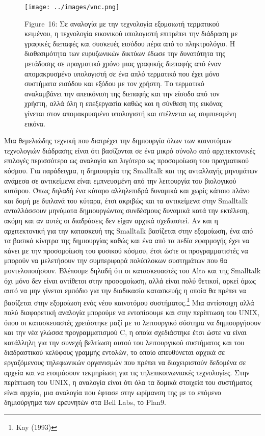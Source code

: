 \documentclass[
]{article}
\begin{document}
\leavevmode{}%
\begin{figure}
\hypertarget{fig:vnc}{%
\centering
\texttt{[image: ../images/vnc.png]}
\caption{Figure~16: Σε αναλογία με την τεχνολογία εξομοιωτή τερματικού
κειμένου, η τεχνολογία εικονικού υπολογιστή επιτρέπει την διάδραση με
γραφικές διεπαφές και συσκευές εισόδου πέρα από το πληκτρολόγιο. Η
διαθεσιμότητα των ευρυζωνικών δικτύων έδωσε την δυνατότητα της μετάδοσης
σε πραγματικό χρόνο μιας γραφικής διεπαφής από έναν απομακρυσμένο
υπολογιστή σε ένα απλό τερματικό που έχει μόνο συστήματα εισόδου και
εξόδου με τον χρήστη. Το τερματικό αναλαμβάνει την απεικόνιση της
διεπαφής και την είσοδο από τον χρήστη, αλλά όλη η επεξεργασία καθώς και
η σύνθεση της εικόνας γίνεται στον απομακρυσμένο υπολογιστή και
στέλνεται ως συμπιεσμένη εικόνα.}\label{fig:vnc}
}
\end{figure}

Μια θεμελιώδης τεχνική που διατρέχει την δημιουργία όλων των καινοτόμων
τεχνολογιών διάδρασης είναι ότι βασίζονται σε ένα μικρό σύνολο από
αρχιτεκτονικές επιλογές περισσότερο ως αναλογία και λιγότερο ως
προσομοίωση του πραγματικού κόσμου. Για παράδειγμα, η δημιουργία της
Smalltalk και της ανταλλαγής μηνυμάτων ανάμεσα σε αντικείμενα είναι
εμπνευσμένη από την λειτουργία του βιολογικού κυτάρου. Όπως δηλαδή ένα
κύταρο αλληλεπιδρά δυναμικά και χωρίς κάποιο πλάνο και δομή με διπλανά
του κύταρα, έτσι ακριβώς και τα αντικείμενα στην Smalltalk ανταλλάσσουν
μηνύματα δημιουργώντας συνδέσμους δυναμικά κατά την εκτέλεση, ακόμη και
αν αυτές οι διαδράσεις δεν είχαν αρχικά σχεδιαστεί. Αν και η
αρχιτεκτονική για την κατασκευή της Smalltalk βασίζεται στην εξομοίωση,
ένα από τα βασικά κίνητρα της δημιουργίας καθώς και ένα από τα πεδία
εφαρμογής έχει να κάνει με την προσομοίωση του φυσικού κόσμου, έτσι ώστε
οι προγραμματιστές να μπορούν να μελετήσουν την συμπεριφορά πολύπλοκων
συστημάτων που θα μοντελοποιήσουν. Βλέπουμε δηλαδή ότι οι κατασκευαστές
του Alto και της Smalltalk όχι μόνο δεν είναι αντίθετοι στην
προσομοίωση, αλλά είναι πολύ θετικοί, αρκεί όμως αυτό να μην γίνεται
εμπόδιο για την διαδικασία κατασκευής η οποία θα πρέπει να βασίζεται
στην εξομοίωση ενός νέου καινοτόμου συστήματος.\footnote{Kay (1993)} Μια
αντίστοιχη αλλά πολύ διαφορετική αναλογία μπορούμε να εντοπίσουμε και
στην περίπτωση του UNIX, όπου οι κατασκευαστές χρειάστηκε μαζί με το
λειτουργικό σύστημα να δημιουργήσουν και την νέα γλώσσα προγραμματισμού
C, η οποία σχεδιάστηκε έτσι ώστε να είναι κατάλληλη για την συνεχή
βελτίωση αυτού του λειτουργικού συστήματος και του διαδραστικού κελύφους
γραμμής εντολών, το οποίο απευθύνεται αρχικά σε εργαζόμενους τηλεφωνικών
οργανισμών που πρέπει να διαχειριστούν δεδομένα σε αρχεία και να
ετοιμάσουν τεκμηρίωση για τις τηλεπικοινωνιακές τεχνολογίες. Στην
περίπτωση του UNIX, η αναλογία είναι ότι όλα τα δομικά στοιχεία του
συστήματος είναι αρχεία, μια αναλογία που έφτασε στην ωρίμανση της με το
επόμενο δημιούργημα των ερευνητών στα Bell Labs, το Plan9.
\end{document}
